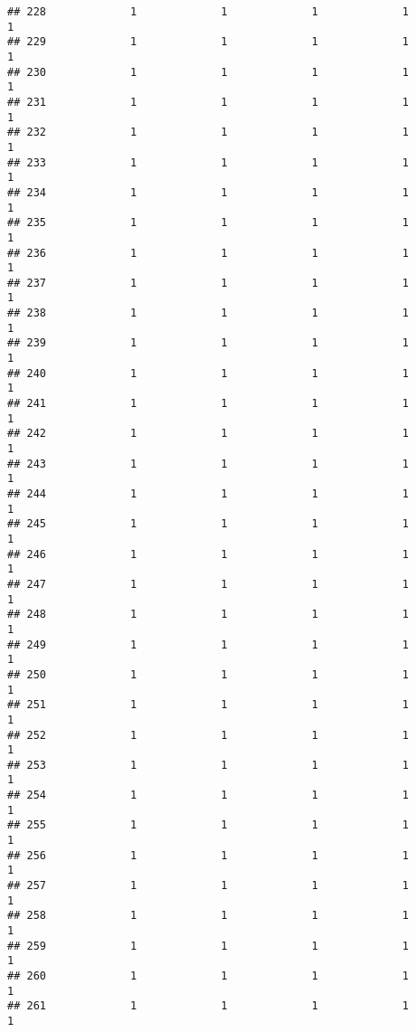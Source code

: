 \documentclass[
]{article}
\begin{document}
\begin{verbatim}
## 228             1             1             1             1             1
## 229             1             1             1             1             1
## 230             1             1             1             1             1
## 231             1             1             1             1             1
## 232             1             1             1             1             1
## 233             1             1             1             1             1
## 234             1             1             1             1             1
## 235             1             1             1             1             1
## 236             1             1             1             1             1
## 237             1             1             1             1             1
## 238             1             1             1             1             1
## 239             1             1             1             1             1
## 240             1             1             1             1             1
## 241             1             1             1             1             1
## 242             1             1             1             1             1
## 243             1             1             1             1             1
## 244             1             1             1             1             1
## 245             1             1             1             1             1
## 246             1             1             1             1             1
## 247             1             1             1             1             1
## 248             1             1             1             1             1
## 249             1             1             1             1             1
## 250             1             1             1             1             1
## 251             1             1             1             1             1
## 252             1             1             1             1             1
## 253             1             1             1             1             1
## 254             1             1             1             1             1
## 255             1             1             1             1             1
## 256             1             1             1             1             1
## 257             1             1             1             1             1
## 258             1             1             1             1             1
## 259             1             1             1             1             1
## 260             1             1             1             1             1
## 261             1             1             1             1             1

\end{verbatim}
\end{document}
